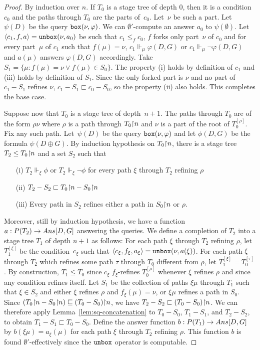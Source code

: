 \begin{proof}
By induction over $n$.
If $T_0$ is a stage tree of depth 0, then it is a condition $c_0$
and the paths through $T_0$ are the parts of~$c_0$. Let~$\nu$ be such a part.
Let~$\psi(D)$ be the query $\mathtt{box}(\nu, \varphi)$.
We can $\emptyset'$-compute an answer $a_0$ to $\psi(\emptyset)$.
Let~$\left\langle c_1,f,a \right\rangle = \mathtt{unbox}(\nu, a_0)$ be such that $c_1 \leq_f c_0$,
$f$ forks only part~$\nu$ of $c_0$ and for every part~$\mu$ of $c_1$ such that $f(\mu) = \nu$,
$c_1 \Vdash_\mu \varphi(D, G)$ or $c_1 \Vdash_\mu \neg \varphi(D, G)$ and $a(\mu)$
answers $\varphi(D,G)$ accordingly. Take $S_1 = \{ \mu : f(\mu) = \nu \vee f(\mu) \in S_0\}$.
The property (i) holds by definition of $c_1$ and (iii) holds by definition of $S_1$.
Since the only forked part is $\nu$ and no part of~$c_1 - S_1$ refines $\nu$,
$c_1 - S_1 \sqsubset c_0 - S_0$, so the property (ii) also holds. This completes the base case.

Suppose now that $T_0$ is a stage tree of depth~$n+1$.
The paths through $T_0$ are of the form $\rho\nu$
where $\rho$ is a path through $T_0 {\upharpoonright} n$ and $\nu$ is a part of the root of $T_0^{[\rho]}$.
Fix any such path. Let~$\psi(D)$ be the query $\mathtt{box}(\nu, \varphi)$
and let $\phi(D, G)$ be the formula $\psi(D \oplus G)$.
By induction hypothesis on $T_0 {\upharpoonright} n$, there is a stage tree $T_2 \leq T_0 {\upharpoonright} n$
and a set $S_2$ such that
\begin{itemize}
	\item[(i)] $T_2 \Vdash_\xi \phi$ or $T_2 \Vdash_\xi \neg \phi$ for every
path $\xi$ through $T_2$ refining $\rho$
	\item[(ii)] $T_2 - S_2 \sqsubset T_0 {\upharpoonright} n - S_0 {\upharpoonright} n$
	\item[(iii)] Every path in $S_2$ refines either a path in $S_0 {\upharpoonright} n$
	or $\rho$.
\end{itemize}
Moreover, still by induction hypothesis, we have a function $a : P(T_2) \to \mathop{Ans}[D, G]$
answering the queries. We define a completion of $T_2$ into a stage tree $T_1$
of depth $n+1$ as follows: For each path $\xi$ through $T_2$ refining $\rho$,
let $T_1^{[\xi]}$ be the condition~$c_\xi$ such that $\left\langle c_\xi, f_\xi, a_\xi \right\rangle = \mathtt{unbox}(\nu, a(\xi))$.
For each path $\xi$ through $T_2$ which refines some path $\tau$ through $T_0$ different from $\rho$, let $T_1^{[\xi]} = T_0^{[\tau]}$.
By construction, $T_1 \leq T_0$ since $c_\xi$ $f_\xi$-refines $T_0^{[\rho]}$ whenever $\xi$ refines $\rho$
and since any condition refines itself. Let $S_1$ be the collection of paths $\xi\mu$
through $T_1$ such that $\xi \in S_2$ and either $\xi$ refines $\rho$ and $f_\xi(\mu) = \nu$, or $\xi\mu$
refines a path in $S_0$. Since $(T_0 {\upharpoonright} n - S_0 {\upharpoonright} n) \sqsubseteq (T_0 - S_0) {\upharpoonright} n$,
we have $T_2 - S_2 \sqsubset (T_0 - S_0) {\upharpoonright} n$. We can therefore apply Lemma~\ref{lem:sq-concatenation} to $T_0 - S_0$, $T_1 - S_1$, and $T_2 - S_2$, to obtain $T_1 - S_1 \sqsubset T_0 - S_0$.
Define the answer function $b : P(T_1) \to \mathop{Ans}[D, G]$ by $b(\xi\mu) = a_\xi(\mu)$
for each path $\xi$ through $T_2$ refining $\rho$. This function $b$ is found $\emptyset'$-effectively
since the $\mathtt{unbox}$ operator is computable.
\end{proof}

